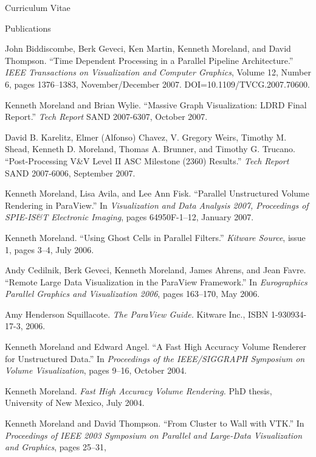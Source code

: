\documentclass{article}
\begin{document}
\begin{cv}{Curriculum Vitae}
    \begin{cvlist}{Publications}
    \item John Biddiscombe, Berk Geveci, Ken Martin, Kenneth Moreland,
      and David Thompson.  ``Time Dependent Processing in a Parallel
      Pipeline Architecture.''  \emph{IEEE Transactions on Visualization
      and Computer Graphics}, Volume 12, Number 6, pages 1376--1383,
      November/December 2007.  DOI=10.1109/TVCG.2007.70600.
    \item Kenneth Moreland and Brian Wylie. ``Massive Graph
      Visualization: LDRD Final Report.''  \emph{Tech Report} SAND
      2007-6307, October 2007.
    \item David B. Karelitz, Elmer (Alfonso) Chavez, V. Gregory Weirs,
      Timothy M. Shead, Kenneth D. Moreland, Thomas A. Brunner, and Timothy
      G. Trucano.  ``Post-Processing V\&V Level II ASC Milestone (2360)
      Results.''  \emph{Tech Report} SAND 2007-6006, September 2007.
    \item Kenneth Moreland, Lisa Avila, and Lee Ann Fisk.  ``Parallel
      Unstructured Volume Rendering in ParaView.''  In
      \emph{Visualization and Data Analysis 2007, Proceedings of
      SPIE-IS\&T Electronic Imaging}, pages 64950F-1--12, January 2007.
    \item Kenneth Moreland.  ``Using Ghost Cells in Parallel Filters.''
      \emph{Kitware Source}, issue 1, pages 3--4, July 2006.
    \item Andy Cedilnik, Berk Geveci, Kenneth Moreland, James Ahrens, and
      Jean Favre.  ``Remote Large Data Visualization in the ParaView
      Framework.''  In \emph{Eurographics Parallel Graphics and
      Visualization 2006}, pages 163--170, May 2006.
    \item Amy Henderson Squillacote.  \emph{The ParaView Guide.}  Kitware
      Inc., ISBN 1-930934-17-3, 2006.
    \item Kenneth Moreland and Edward Angel.  ``A Fast High Accuracy
      Volume Renderer for Unstructured Data.''  In \emph{Proceedings of
        the IEEE/SIGGRAPH Symposium on Volume Visualization}, pages 9--16,
      October 2004.
    \item Kenneth Moreland.  \emph{Fast High Accuracy Volume Rendering.}
      PhD thesis, University of New Mexico, July 2004.
    \item Kenneth Moreland and David Thompson.  ``From Cluster to Wall
      with VTK.''  In \emph{Proceedings of IEEE 2003 Symposium on
      Parallel and Large-Data Visualization and Graphics}, pages 25--31,

\end{cvlist}
\end{cv}
\end{document}

